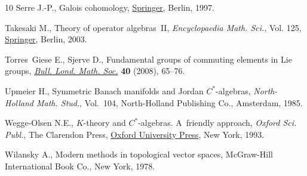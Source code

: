 \documentclass[pdftex]{sigma}
\numberwithin{equation}{section}
\begin{document}
\begin{thebibliography}{10}
Serre J.-P., Galois cohomology, \href{https://doi.org/10.1007/978-3-642-59141-9}{Springer}, Berlin, 1997.

Takesaki M., Theory of operator algebras~{II}, \textit{Encyclopaedia Math.
 Sci.}, Vol. 125, \href{https://doi.org/10.1007/978-3-662-10451-4}{Springer}, Berlin, 2003.

Torres~Giese E., Sjerve D., Fundamental groups of commuting elements in {L}ie
 groups, \href{https://doi.org/10.1112/blms/bdm094}{\textit{Bull. Lond. Math. Soc.}} \textbf{40} (2008), 65--76.

Upmeier H., Symmetric {B}anach manifolds and {J}ordan {$C^\ast$}-algebras,
 \textit{North-Holland Math. Stud.}, Vol.~104, North-Holland Publishing Co.,
 Amsterdam, 1985.

Wegge-Olsen N.E., {$K$}-theory and {$C^*$}-algebras. {A}~friendly approach,
 \textit{Oxford Sci. Publ.}, The Clarendon Press, \href{https://doi.org/10.1093/oso/9780198596943.001.0001}{Oxford University Press}, New York,
 1993.

Wilansky A., Modern methods in topological vector spaces, McGraw-Hill
 International Book Co., New York, 1978.

\end{thebibliography}\LastPageEnding
\end{document}
